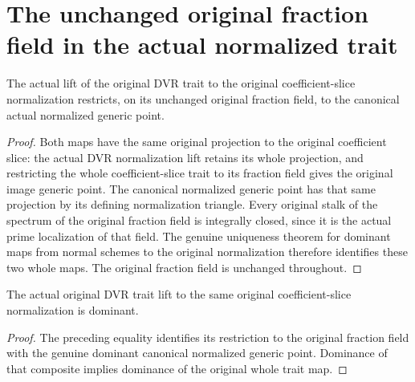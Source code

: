\section{The unchanged original fraction field in the actual normalized trait}
\begin{theorem}\label{thm:coefficient-slice-normalized-trait-fraction}
The actual lift of the original DVR trait to the original coefficient-slice normalization restricts, on its unchanged original fraction field, to the canonical actual normalized generic point.
\leanok
\end{theorem}
\begin{proof}
Both maps have the same original projection to the original coefficient slice: the actual DVR normalization lift retains its whole projection, and restricting the whole coefficient-slice trait to its fraction field gives the original image generic point. The canonical normalized generic point has that same projection by its defining normalization triangle. Every original stalk of the spectrum of the original fraction field is integrally closed, since it is the actual prime localization of that field. The genuine uniqueness theorem for dominant maps from normal schemes to the original normalization therefore identifies these two whole maps. The original fraction field is unchanged throughout.
\end{proof}
\begin{theorem}\label{thm:coefficient-slice-normalized-trait-dominant}
The actual original DVR trait lift to the same original coefficient-slice normalization is dominant.
\leanok
\end{theorem}
\begin{proof}
The preceding equality identifies its restriction to the original fraction field with the genuine dominant canonical normalized generic point. Dominance of that composite implies dominance of the original whole trait map.
\end{proof}
